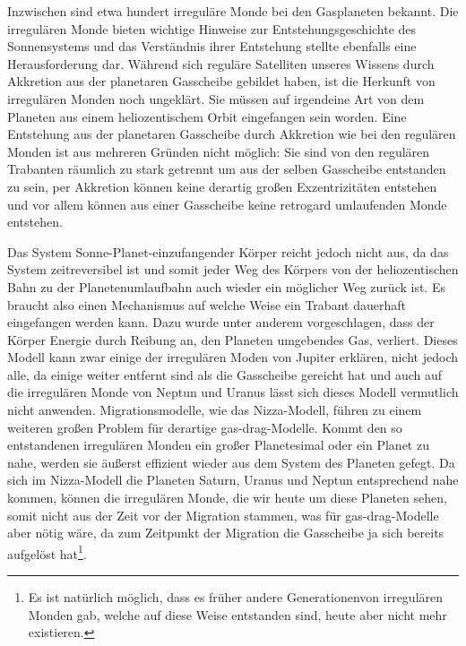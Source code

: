 \documentclass[12pt,a4paper,twoside]{article}
\renewcommand{\cite}{\citep}
\begin{document}
Inzwischen sind etwa hundert irreguläre Monde bei den Gasplaneten bekannt. %
Die irregulären Monde bieten wichtige Hinweise zur Entstehungsgeschichte des Sonnensystems und das Verständnis ihrer Entstehung stellte ebenfalls eine Herausforderung dar.
Während sich reguläre Satelliten unseres Wissens durch Akkretion aus der planetaren Gasscheibe gebildet haben, ist die Herkunft von irregulären Monden noch ungeklärt.
Sie müssen auf irgendeine Art von dem Planeten aus einem heliozentischem Orbit eingefangen sein worden. Eine Entstehung aus der planetaren Gasscheibe durch Akkretion wie bei den regulären Monden ist aus mehreren Gründen nicht möglich:
Sie sind von den regulären Trabanten räumlich zu stark getrennt um aus der selben Gasscheibe entstanden zu sein, per Akkretion können keine derartig großen Exzentrizitäten entstehen und vor allem können aus einer Gasscheibe keine retrogard umlaufenden Monde entstehen\cite{Nesvorny2007}. %

Das System Sonne-Planet-einzufangender Körper reicht jedoch nicht aus, da das System zeitreversibel ist und somit jeder Weg des Körpers von der heliozentischen Bahn zu der Planetenumlaufbahn auch wieder ein möglicher Weg zurück ist\cite{Nesvorny2007}. %
Es braucht also einen Mechanismus auf welche Weise ein Trabant dauerhaft eingefangen werden kann. Dazu wurde unter anderem vorgeschlagen, dass der Körper Energie durch Reibung an, den Planeten umgebendes Gas, verliert. %
Dieses Modell kann zwar einige der irregulären Moden von Jupiter erklären, nicht jedoch alle, da einige weiter entfernt sind als die Gasscheibe gereicht hat und auch auf die irregulären Monde von Neptun und Uranus lässt sich dieses Modell vermutlich nicht anwenden\cite{Nesvorny2007}. %
Migrationsmodelle, wie das Nizza-Modell, führen zu einem weiteren großen Problem für derartige \glqq gas-drag\grqq-Modelle. Kommt den so entstandenen irregulären Monden ein großer Planetesimal oder ein Planet zu nahe, werden sie äußerst effizient wieder aus dem System des Planeten gefegt\cite{Nesvorny2007}. Da sich im Nizza-Modell die Planeten Saturn, Uranus und Neptun entsprechend nahe kommen, können die irregulären Monde, die wir heute um diese Planeten sehen, somit nicht aus der Zeit vor der Migration stammen\cite{Tsiganis2005,Nesvorny2007}, was für \glqq gas-drag\grqq-Modelle aber nötig wäre, da zum Zeitpunkt der Migration die Gasscheibe ja sich bereits aufgelöst hat\footnote{Es ist natürlich möglich, dass es früher andere \glqq Generationen\grqq von irregulären Monden gab, welche auf diese Weise entstanden sind, heute aber nicht mehr existieren. }. %
\end{document}
